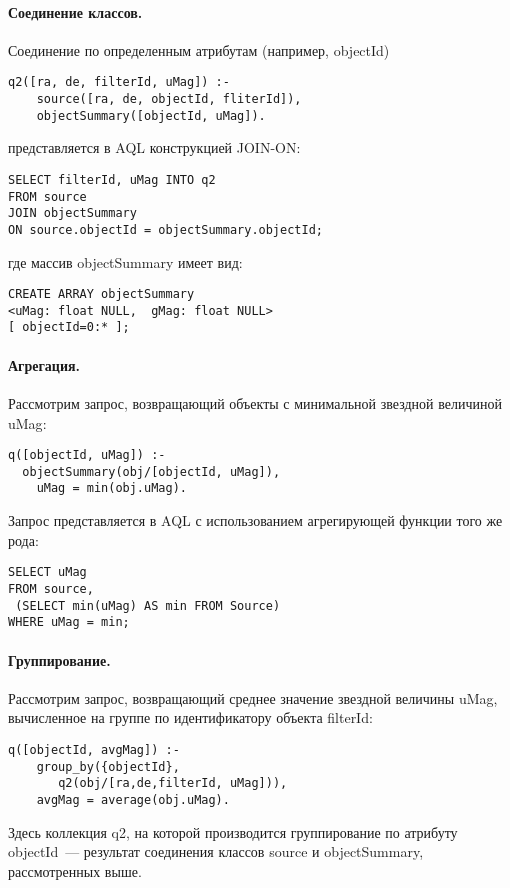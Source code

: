 \begin{multicols}{2}
\paragraph*{Соединение классов.} Соединение по определенным атрибутам 
(например, {\sf objectId})
        \begin{verbatim}
q2([ra, de, filterId, uMag]) :- 
    source([ra, de, objectId, fliterId]), 
    objectSummary([objectId, uMag]).
\end{verbatim}
представляется в AQL конструкцией {\sf JOIN-ON}:
\begin{verbatim}
SELECT filterId, uMag INTO q2
FROM source
JOIN objectSummary 
ON source.objectId = objectSummary.objectId;
\end{verbatim}
где массив {\sf objectSummary} имеет вид: 
\begin{verbatim}
CREATE ARRAY objectSummary
<uMag: float NULL,  gMag: float NULL>
[ objectId=0:* ];
\end{verbatim}
        
\paragraph*{Агрегация.} Рассмотрим запрос, возвращающий объекты с 
минимальной звездной величиной {\sf uMag}:
        \begin{verbatim}
q([objectId, uMag]) :-  
  objectSummary(obj/[objectId, uMag]), 
    uMag = min(obj.uMag).
\end{verbatim}

        Запрос представляется в AQL с использованием агрегирующей функции 
того же рода:
        \begin{verbatim}
SELECT uMag
FROM source, 
 (SELECT min(uMag) AS min FROM Source)
WHERE uMag = min;
\end{verbatim}
        
\paragraph*{Группирование.} Рассмотрим запрос, возвра\-ща\-ющий среднее 
значение звездной величины {\sf uMag}, вычисленное на группе по 
идентификатору объекта {\sf filterId}:
        \begin{verbatim}
q([objectId, avgMag]) :- 
    group_by({objectId}, 
       q2(obj/[ra,de,filterId, uMag])),
    avgMag = average(obj.uMag).
\end{verbatim}

        Здесь коллекция {\sf q2}, на которой производится группирование по 
атрибуту {\sf objectId}~--- результат соединения классов {\sf source} и 
{\sf objectSummary}, рассмотренных выше.
        

\end{multicols}
